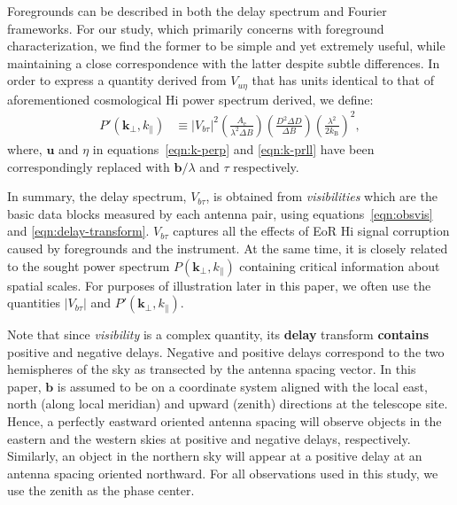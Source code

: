 \documentclass[preprint2,iop,numberedappendix]{emulateapj}
\begin{document}
Foregrounds can be described in both the delay spectrum and Fourier frameworks. For our study, which primarily concerns with foreground characterization, we find the former to be simple and yet extremely useful, while maintaining a close correspondence with the latter despite subtle differences. In order to express a quantity derived from $V_{u\eta}$ that has units identical to that of aforementioned cosmological H{\sc i} power spectrum derived, we define:
\begin{align}\label{eqn:fake-power-spectrum}
  P'(\boldsymbol{k}_\perp,k_\parallel) &\equiv |V_{b\tau}|^2\left(\frac{A_\textrm{e}}{\lambda^2\Delta B}\right)\left(\frac{D^2\Delta D}{\Delta B}\right)\left(\frac{\lambda^2}{2k_\textrm{B}}\right)^2,
\end{align}
where, $\boldsymbol{u}$ and $\eta$ in equations~\ref{eqn:k-perp} and \ref{eqn:k-prll} have been correspondingly replaced with $\boldsymbol{b}/\lambda$ and $\tau$ respectively.

In summary, the delay spectrum, $V_{b\tau}$, is obtained from {\it visibilities} which are the basic data blocks measured by each antenna pair, using equations~\ref{eqn:obsvis} and \ref{eqn:delay-transform}. $V_{b\tau}$ captures all the effects of EoR H{\sc i} signal corruption caused by foregrounds and the instrument. At the same time, it is closely related to the sought power spectrum $P(\boldsymbol{k}_\perp,k_\parallel)$ containing critical information about spatial scales. For purposes of illustration later in this paper, we often use the quantities $|V_{b\tau}|$ and $P'(\boldsymbol{k}_\perp,k_\parallel)$.

Note that since {\it visibility} is a complex quantity, its {\bf delay} transform {\bf contains} positive and negative delays. Negative and positive delays correspond to the two hemispheres of the sky as transected by the antenna spacing vector. In this paper, $\boldsymbol{b}$ is assumed to be on a coordinate system aligned with the local east, north (along local meridian) and upward (zenith) directions at the telescope site. Hence, a perfectly eastward oriented antenna spacing will observe objects in the eastern and the western skies at positive and negative delays, respectively. Similarly, an object in the northern sky will appear at a positive delay at an antenna spacing oriented northward. For all observations used in this study, we use the zenith as the phase center. 
\end{document}
